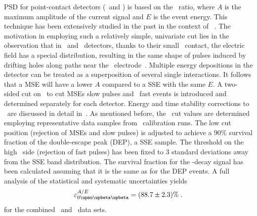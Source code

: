 PSD for point-contact detectors (\bege\ and \icoax) is based on the \aoe\ ratio, where $A$
is the maximum amplitude of the current signal and $E$ is the event energy. This technique
has been extensively studied in the past in the context of \gerda~\cite{Agostini2013,
Agostini2010, Budjas2008, Budjas2009, Budjas2009a, Agostini2010a}. The motivation in
employing such a relatively simple, univariate cut lies in the observation that in
\bege\ and \icoax\ detectors, thanks to their small \pplus\ contact, the electric field
has a special distribution, resulting in the same shape of pulses induced by drifting
holes along paths near the \pplus\ electrode~\cite{Agostini2010}. Multiple energy
depositions in the detector can be treated as a superposition of several single
interactions. It follows that a MSE will have a lower $A$ compared to a SSE with the
same $E$.  A two-sided cut on \aoe\ to cut MSEs slow pulses and \pplus\ fast events is
introduced and determined separately for each detector. Energy and time stability
corrections to \aoe\ are discussed in detail in~\cite{psd-paper}. As mentioned before,
the \aoe\ cut values are determined employing representative data samples from \Th\
calibration runs.  The low cut position (rejection of MSEs and slow pulses) is adjusted
to achieve a 90\% survival fraction of the double-escape peak (DEP), a SSE sample. The
threshold on the high \aoe\ side (rejection of fast pulses) has been fixed to 3 standard
deviations away from the SSE band distribution. The survival fraction for the
\onbb-decay signal has been calculated assuming that it is the same as for the DEP
events. A full analysis of the statistical and systematic uncertainties yields
\[
  \epsilon_\onbbM^{A/E} = (88.7 \pm 2.3)\% \;.
\]
for the combined \bege\ and \icoax\ data sets.

